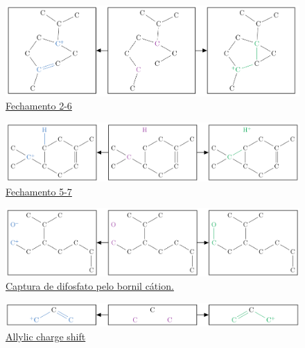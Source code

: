 \begin{figure}[H]
	\centering
	\includegraphics[width=.925\textwidth]{images/r14.png}
	\caption{\href{https://github.com/waldeyr/2PathTerpenes/blob/master/rules/2-6-closure.gml}{Fechamento 2-6}}
	\label{figRule14}
\end{figure}

\begin{figure}[H]
	\centering
	\includegraphics[width=.925\textwidth]{images/r15.png}
	\caption{\href{https://github.com/waldeyr/2PathTerpenes/blob/master/rules/5-7-closure.gml}{Fechamento 5-7}}
	\label{figRule15}
\end{figure}

\begin{figure}[H]
	\centering
	\includegraphics[width=.925\textwidth]{images/r16.png}
	\caption{\href{https://github.com/waldeyr/2PathTerpenes/blob/master/rules/opp_gain_by_bornyl_cation.gml}{Captura de difosfato pelo bornil cátion.}}
	\label{figRule16}
\end{figure}

\begin{figure}[H]
	\centering
	\includegraphics[width=.925\textwidth]{images/r17.png}
	\caption{\href{https://github.com/waldeyr/2PathTerpenes/blob/master/rules/allylshift.gml}{Allylic charge shift}}
	\label{figRule17}
\end{figure}


